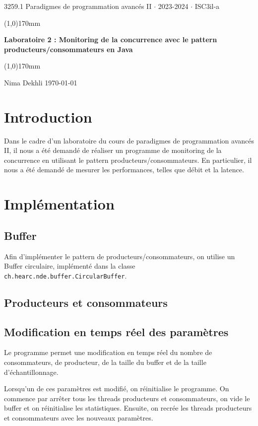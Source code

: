 \documentclass[
  french,
  a4paper,
]{scrartcl}
\renewcommand*\maketitle{
  \begin{center}
    \sffamily
  
    \vspace*{10pt}
    \Large 3259.1 Paradigmes de programmation avancés II $\cdot$ 2023-2024 $\cdot$ ISC3il-a

    \line(1,0){170mm}

    \huge \textbf{Laboratoire 2 : Monitoring de la concurrence avec le pattern producteurs/consommateurs en Java}    

    \line(1,0){170mm}
  \end{center}

    \vspace{10pt}
    
    \sffamily
    \Large Nima Dekhli \hfill \today
    
    \vspace{8pt}
}
\begin{document}
\maketitle
\rmfamily
\normalsize
\tableofcontents
\thispagestyle{firstpage}
\newpage

\section{Introduction}

Dans le cadre d'un laboratoire du cours de paradigmes de programmation avancés II, 
il nous a été demandé de réaliser un programme de monitoring de la concurrence 
en utilisant le pattern producteurs/consommateurs. En particulier, 
il nous a été demandé de mesurer les performances, telles que débit 
et la latence. 


\section{Implémentation}

\subsection{Buffer}

Afin d'implémenter le pattern de producteurs/consommateurs, on utilise un 
Buffer circulaire, implémenté dans la classe \lstinline{ch.hearc.nde.buffer.CircularBuffer}. 


\subsection{Producteurs et consommateurs}


\subsection{Modification en temps réel des paramètres}

Le programme permet une modification en temps réel du nombre de consommateurs, de 
producteur, de la taille du buffer et de la taille d'échantillonnage. 

Lorsqu'un de ces paramètres est modifié, on réinitialise le programme. On commence
par arrêter tous les threads producteurs et consommateurs, on vide le buffer et on
réinitialise les statistiques. Ensuite, on recrée les threads producteurs et consommateurs
avec les nouveaux paramètres.
\end{document}
